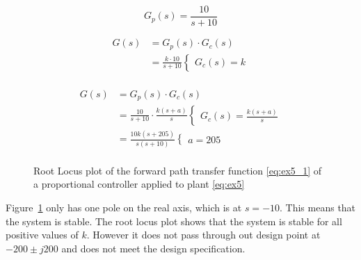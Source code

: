 \renewcommand{\ex}{ex5} 

\begin{equation}
	G_{p}\left(s\right)=\frac{10}{s + 10}
	\label{eq:\ex}
\end{equation}

\begin{equation}
    \begin{split}
        G\left(s\right) &= G_{p}\left(s\right)\cdot G_{c}\left(s\right)\\
        &=\frac{k \cdot 10}{s + 10}
        \begin{cases}
            G_{c}\left(s\right)=k
        \end{cases}\\
    \end{split}
    \label{eq:\ex_1}
\end{equation}

\begin{equation}
    \begin{split}
        G\left(s\right) &= G_{p}\left(s\right)\cdot G_{c}\left(s\right)\\
        &=\frac{10}{s + 10} \cdot \frac{k\left(s+a\right)}{s}
        \begin{cases}
            G_{c}\left(s\right)=\frac{k\left(s+a\right)}{s}
        \end{cases}\\
        &=\frac{10k\left(s+205\right)}{s\left(s+10\right)}
        \begin{cases}
            a=205
        \end{cases}\\
    \end{split}
    \label{eq:\ex_2}
\end{equation}

\begin{figure}[ht!]
    \centering
    
    \caption{Root Locus plot of the forward path transfer function \eqref{eq:\ex_1} of a proportional controller applied to plant \eqref{eq:\ex} \appendixamble{\ex}}
    \label{fig:\ex}
\end{figure}\FloatBarrier

Figure~\ref{fig:\ex} only has one pole on the real axis, which is at $s = -10$. This means that the system is stable. The root locus plot shows that the system is stable for all positive values of $k$. However it does not pass through out design point at $-200 \pm j200$ and does not meet the design specification. \\

